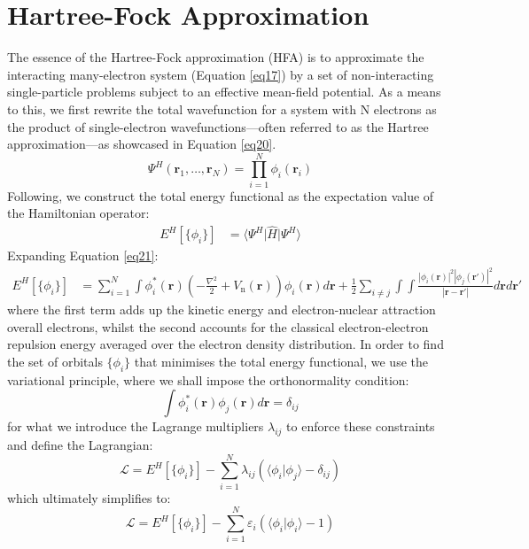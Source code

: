 
\section{Hartree-Fock Approximation}
The essence of the Hartree-Fock approximation (HFA) is to approximate the interacting many-electron system (Equation \ref{eq17}) by a set of non-interacting single-particle problems subject to an effective mean-field potential\supercite{martin2016interacting, helgaker2014molecular, feng2005introduction}. As a means to this, we first rewrite the total wavefunction for a system with N electrons as the product of single-electron wavefunctions---often referred to as the Hartree approximation\supercite{Hartree1928}---as showcased in Equation \ref{eq20}. 
\begin{equation}
  \Psi^H(\mathbf{r}_1, \dots, \mathbf{r}_N) = \prod_{i=1}^N \phi_i(\mathbf{r}_i)
  \label{eq20}
\end{equation}
Following, we construct the total energy functional as the expectation value of the Hamiltonian operator:
\begin{equation}
  \label{eq21}
\begin{aligned}
  E^{H}[\{\phi_i\}] &= \bigg\langle \Psi^H \bigg| \hat{H} \bigg| \Psi^H \bigg\rangle 
\end{aligned}
\end{equation}
Expanding Equation \ref{eq21}:
\begin{equation}
  \label{eq22}
  \begin{split}
    E^{H}[\{\phi_i\}] &= \sum^N_{i=1} \int \phi_i^*(\mathbf{r}) \left(-\frac{\nabla^2}{2} + V_{\text{n}}(\mathbf{r})\right) \phi_i(\mathbf{r}) d\mathbf{r}  + \frac{1}{2} \sum_{i\neq j} \int\int \frac{|\phi_i(\mathbf{r})|^2 |\phi_j(\mathbf{r'})|^2 }{|\mathbf{r} - \mathbf{r'}|} d\mathbf{r} d\mathbf{r'}
  \end{split}
\end{equation}
where the first term adds up the kinetic energy and electron-nuclear attraction overall electrons, whilst the second accounts for the classical electron-electron repulsion energy averaged over the electron density distribution. In order to find the set of orbitals $\{\phi_i\}$ that minimises the total energy functional, we use the variational principle, where we shall impose the orthonormality condition: 
\begin{equation}
  \label{eq23}
  \int \phi_i^*(\mathbf{r}) \phi_j(\mathbf{r}) d\mathbf{r} = \delta_{ij}
\end{equation}
for what we introduce the Lagrange multipliers $\lambda_{ij}$ to enforce these constraints and define the Lagrangian:
\begin{equation}
  \label{eq24}
  \mathcal{L} = E^H[\{\phi_i\}] - \sum_{i=1}^{N}\lambda_{ij} ( \langle\phi_i|\phi_j\rangle - \delta_{ij})
\end{equation}
which ultimately simplifies to:
\begin{equation}
  \label{eq25}
  \mathcal{L} = E^H[\{\phi_i\}] - \sum_{i=1}^{N}\varepsilon_{i} ( \langle\phi_i|\phi_i\rangle - 1)
\end{equation}

